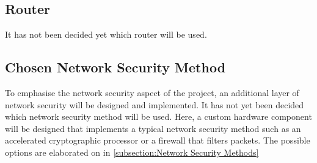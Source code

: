 \subsection{Router}
It has not been decided yet which router will be used.
\subsection{Chosen Network Security Method}
To emphasise the network security aspect of the project, an additional layer of network security will be designed and implemented. It has not yet been decided which network security method will be used. Here, a custom hardware component will be designed that implements a typical network security method such as an accelerated cryptographic processor or a firewall that filters packets. The possible options are elaborated on in \ref{subsection:Network Security Methods}
\clearpage